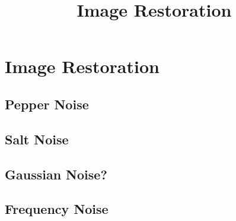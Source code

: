 \documentclass[12pt,a4paper]{article}
\begin{document}
\title{Image Restoration}
\maketitle

\pagebreak


\section{Image Restoration}




\subsection{Pepper Noise}


\subsection{Salt Noise}


\subsection{Gaussian Noise?}


\subsection{Frequency Noise}
\end{document}
